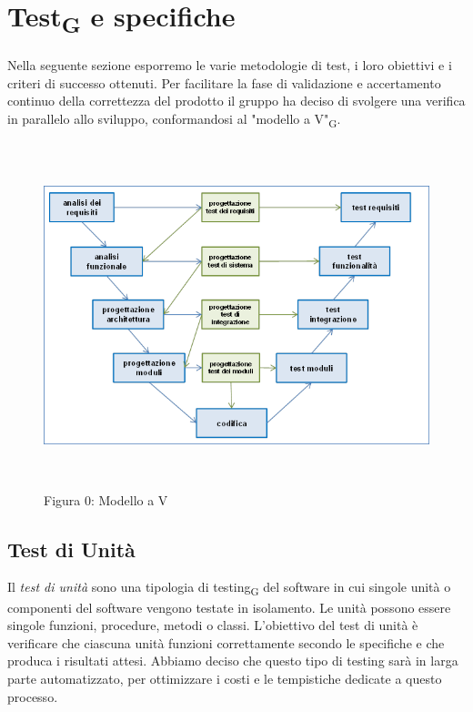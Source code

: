 \documentclass{article}
\begin{document}
\section{Test\textsubscript{G} e specifiche}
Nella seguente sezione esporremo le varie metodologie di test, i loro obiettivi e i criteri di successo ottenuti. Per facilitare la fase di validazione e accertamento continuo della correttezza del prodotto il gruppo ha deciso di svolgere una verifica in parallelo allo sviluppo, conformandosi al "modello a V"\textsubscript{G}.  
\begin{figure}[H]
    \centering
    \includegraphics[width=15cm, height=10cm]{./documenti/grafici/modello_a_v.png}
    \caption{Figura 0: Modello a V}
\end{figure}


\subsection{Test di Unità}
Il \textit{test di unità} sono una tipologia di testing\textsubscript{G} del software in cui singole unità o componenti del software vengono testate in isolamento. Le unità possono essere singole funzioni, procedure, metodi o classi. L'obiettivo del test di unità è verificare che ciascuna unità funzioni correttamente secondo le specifiche e che produca i risultati attesi. Abbiamo deciso che questo tipo di testing sarà in larga parte automatizzato, per ottimizzare i costi e le tempistiche dedicate a questo processo.
\end{document}

